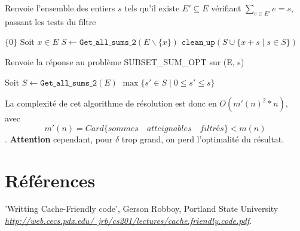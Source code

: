 \documentclass[10pt]{article}
\let\oldReturn\Return
\renewcommand{\Return}{\State\oldReturn}
\begin{document}
					\begin{algorithm}
					\caption{Renvoie l'ensemble des entiers $s$ tels qu'il existe
								$E' \subseteq E$ vérifiant $\sum\limits_{e \in E'}e = s$, passant les tests du filtre}
					\begin{algorithmic}[1]
								\Return $\{0\}$
							\EndIf
							\State Soit $x \in E$
							\State $S \leftarrow \mathtt{Get\_all\_sums\_2}(E \backslash \{x\})$
							\Return $\mathtt{clean\_up}(S \cup \{x + s \mid s \in S\})$
						\EndFunction
					\end{algorithmic}
				\end{algorithm}
				
				\begin{algorithm}
					\caption{Renvoie la réponse au problème SUBSET\_SUM\_OPT sur (E, s)}
					\begin{algorithmic}[1]
						\Function{subset\_sum}{$E \subset \mathbb{N}, s \in \mathbb{N}$}
							\State Soit $S \leftarrow \mathtt{Get\_all\_sums\_2}(E)$
							\Return $\max\{s' \in S \mid 0 \leq s' \leq s\}$
						\EndFunction
					\end{algorithmic}
				\end{algorithm}
				La complexité de cet algorithme de résolution est donc en $\boxed{O(m'(n)^2 * n)}$,
				avec $$m'(n) = Card\{sommes \quad atteignables \quad filtrés\} < m(n)$$.
				\textbf{Attention} cependant, pour $\delta$ trop grand, on perd l'optimalité du résultat.
				
	\newpage
	\section{Références}
		\begin{thebibliography}{}
				'Writting Cache-Friendly code', Gerson Robboy, Portland State University\newline
				\href{http://web.cecs.pdx.edu/~jrb/cs201/lectures/cache.friendly.code.pdf}
				      {\textit{http://web.cecs.pdx.edu/~jrb/cs201/lectures/cache.friendly.code.pdf}}.
  \end{thebibliography}
\end{document}
